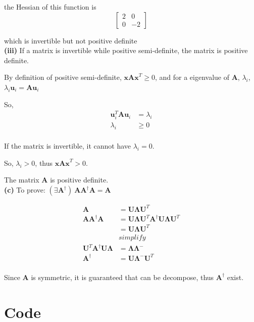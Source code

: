 \documentclass[11pt]{article}
\begin{document}
the Hessian of this function is\\

$$\begin{bmatrix}
2&0\\0&-2
\end{bmatrix}
$$

which is invertible but not positive definite\\

\pagebreak
\textbf{(iii)}
If a matrix is invertible while positive semi-definite, the matrix is positive definite.

By definition of positive semi-definite, $\textbf{xAx}^T\ge 0$, and for a eigenvalue of $\textbf{A}$, $\lambda_i$, $\lambda_i\textbf{u}_i=\textbf{Au}_i$ 

So, 
\begin{equation} \label{eq7}
\begin{split}
\textbf{u}_i^T\textbf{A}\textbf{u}_i&=\lambda_i\\
\lambda_i&\ge 0\\
\end{split}
\end{equation}

If the matrix is invertible, it cannot have $\lambda_i = 0$.

So, $\lambda_i>0$, thus $\textbf{xAx}^T>0$.

The matrix \textbf{A} is positive definite.\\

\noindent\textbf{(c)}
To prove: $(\exists \textbf{A}^\dagger)\ \textbf{AA}^\dagger \textbf{A} = \textbf{A}$

\begin{equation} \label{eq8}
\begin{split}
\textbf{A}&=\textbf{U}\pmb{\Lambda}\textbf{U}^T\\
\textbf{AA}^\dagger \textbf{A}&=\textbf{U}\pmb{\Lambda}\textbf{U}^T\textbf{A}^\dagger\textbf{U}\pmb{\Lambda}\textbf{U}^T\\
&=\textbf{U}\pmb{\Lambda}\textbf{U}^T\\
&simplify\\
\textbf{U}^T\textbf{A}^\dagger\textbf{U}\pmb{\Lambda}&=\pmb{\Lambda}\pmb{\Lambda}^-\\
\textbf{A}^\dagger&=\textbf{U}\pmb{\Lambda}^{-}\textbf{U}^T\\
\end{split}
\end{equation}

Since \textbf{A} is symmetric, it is guaranteed that can be decompose,
thus $\textbf{A}^\dagger$ exist.

\pagebreak
\section*{Code}
\end{document}
